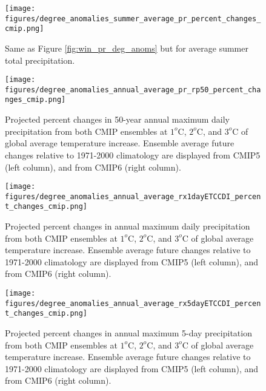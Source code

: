 \documentclass[]{scrartcl}
\begin{document}
\begin{appendices}
\begin{figure}[ht!]
	\centering
	\texttt{[image: figures/degree\_anomalies\_summer\_average\_pr\_percent\_changes\_cmip.png]}
	\caption[Pr]{Same as Figure \ref{fig:win_pr_deg_anoms} but for average summer total precipitation.}
	\label{fig:summer_pr_deg_anoms}
\end{figure}

\begin{figure}[ht!]
	\centering
	\texttt{[image: figures/degree\_anomalies\_annual\_average\_pr\_rp50\_percent\_changes\_cmip.png]}
	\caption[Tas]{Projected percent changes in 50-year annual maximum daily precipitation from both CMIP ensembles at $1^o$C, $2^o$C, and $3^o$C of global average temperature increase. Ensemble average future changes relative to 1971-2000 climatology are displayed from CMIP5 (left column), and from CMIP6 (right column).}
	\label{fig:ext_pr50_deg_anoms}
\end{figure}


\begin{figure}[ht!]
	\centering
	\texttt{[image: figures/degree\_anomalies\_annual\_average\_rx1dayETCCDI\_percent\_changes\_cmip.png]}
	\caption[Pr]{Projected percent changes in annual maximum daily precipitation from both CMIP ensembles at $1^o$C, $2^o$C, and $3^o$C of global average temperature increase. Ensemble average future changes relative to 1971-2000 climatology are displayed from CMIP5 (left column), and from CMIP6 (right column).}
	\label{fig:rx1day_deg_anoms}
\end{figure}

\begin{figure}[ht!]
	\centering
	\texttt{[image: figures/degree\_anomalies\_annual\_average\_rx5dayETCCDI\_percent\_changes\_cmip.png]}
	\caption[Pr]{Projected percent changes in annual maximum 5-day precipitation from both CMIP ensembles at $1^o$C, $2^o$C, and $3^o$C of global average temperature increase. Ensemble average future changes relative to 1971-2000 climatology are displayed from CMIP5 (left column), and from CMIP6 (right column).}
	\label{fig:rx5day_deg_anoms}
\end{figure}



\end{appendices}
\end{document}
